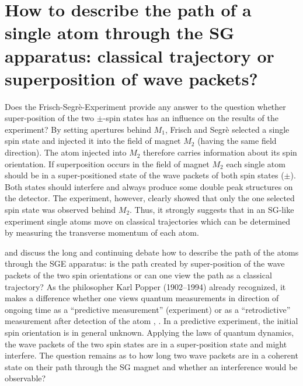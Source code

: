 \documentclass[12pt]{article}
\begin{document}
\section{How to describe the path of a single atom through the SG apparatus: classical trajectory or superposition of wave packets?}

Does the Frisch-Segrè-Experiment provide any answer to the question whether super-position of the two $\pm$-spin states has an influence on the results of the experiment? By setting apertures behind $M_1$, Frisch and Segrè selected a single spin state and injected it into the field of magnet $M_2$ (having the same field direction). The atom injected into $M_2$ therefore carries information about its spin orientation. If superposition occurs in the field of magnet $M_2$ each single atom should be in a super-positioned state of the wave packets of both spin states ($\pm$). Both states should interfere and always produce some double peak structures on the detector. The experiment, however, clearly showed that only the one selected spin state was observed behind $M_2$. Thus, it strongly suggests that in an SG-like experiment single atoms move on classical trajectories which can be determined by measuring the transverse momentum of each atom.

\cite{DevereuxM2015Reduction} and \cite{WennerstroemHEtal2012experiment,WennerstroemHEtal2013measurements,WennerstroemHEtal2014Interpretation} discuss the long and continuing debate how to describe the path of the atoms through the SGE apparatus: is the path created by super-position of the wave packets of the two spin orientations or can one view the path as a classical trajectory? 
As the philosopher Karl Popper (1902--1994) already recognized, it makes a difference whether one views quantum measurements in direction of ongoing time as a ``predictive measurement'' (experiment) or as a ``retrodictive'' measurement after detection of the atom \cite[sec.~77, App.~vi]{PopperK1989Logic}, \cite[pp.~60--64]{PopperK1982Theory}. In a predictive experiment, the initial spin orientation is in general unknown. Applying the laws of quantum dynamics, the wave packets of the two spin states are in a super-position state and might interfere. The question remains as to how long two wave packets are in a coherent state on their path through the SG magnet and whether an interference would be observable? 
\end{document}
